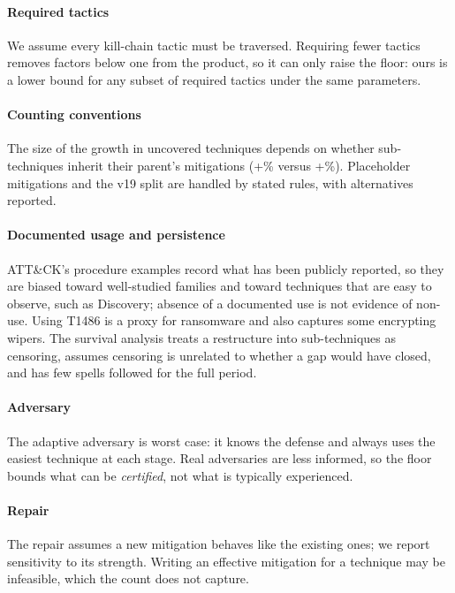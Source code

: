 \documentclass[conference,compsoc]{IEEEtran}
\begin{document}
\paragraph{Required tactics} We assume every kill-chain tactic must be traversed.
Requiring fewer tactics removes factors below one from the product, so it can only raise
the floor: ours is a lower bound for any subset of required tactics under the same
parameters.

\paragraph{Counting conventions} The size of the growth in uncovered techniques depends
on whether sub-techniques inherit their parent's mitigations
(+\GapUncGrowthPct\% versus +\GapInhGrowthPct\%). Placeholder mitigations and the v19
split are handled by stated rules, with alternatives reported.

\paragraph{Documented usage and persistence} ATT\&CK's procedure examples record what
has been publicly reported, so they are biased toward well-studied families and toward
techniques that are easy to observe, such as Discovery; absence of a documented use is not
evidence of non-use. Using T1486 is a proxy for ransomware and also captures some
encrypting wipers. The survival analysis treats a restructure into sub-techniques as
censoring, assumes censoring is unrelated to whether a gap would have closed, and has
few spells followed for the full period.

\paragraph{Adversary} The adaptive adversary is worst case: it knows the defense and
always uses the easiest technique at each stage. Real adversaries are less informed, so
the floor bounds what can be \emph{certified}, not what is typically experienced.

\paragraph{Repair} The repair assumes a new mitigation behaves like the existing ones;
we report sensitivity to its strength. Writing an effective mitigation for a technique
may be infeasible, which the count does not capture.
\end{document}
